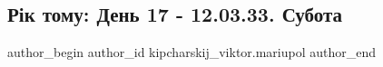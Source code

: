  
 
 
 
 

\subsection{Рік тому:  День 17 - 12.03.33. Субота}
\label{sec:12_03_2023.fb.kipcharskij_viktor.mariupol.1.r_k_tomu___den_17___}

\ifcmt
 author_begin
   author_id kipcharskij_viktor.mariupol
 author_end
\fi
